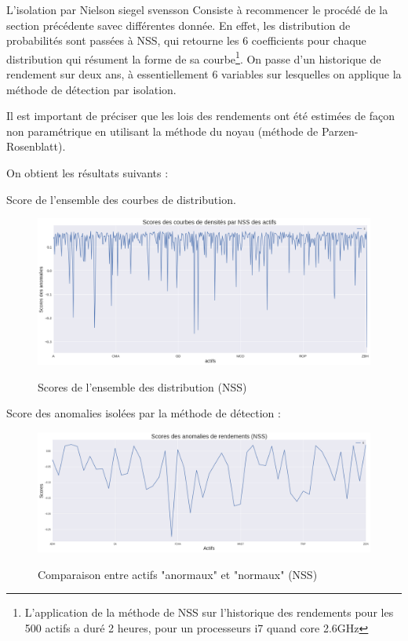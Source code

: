 L'isolation par Nielson siegel svensson Consiste à recommencer le procédé de la section précédente savec différentes donnée. En effet, les distribution de probabilités sont passées à NSS, qui retourne les 6 coefficients pour chaque distribution qui résument la forme de sa courbe\footnote{L'application de la méthode de NSS sur l'historique des rendements pour les 500 actifs a duré 2 heures, pour un processeurs i7 quand core 2.6GHz }. On passe d'un historique de rendement sur deux ans, à essentiellement 6 variables sur lesquelles on applique la méthode de détection par isolation.

Il est important de préciser que les lois des rendements ont été estimées de façon non paramétrique en utilisant la méthode du noyau (méthode de Parzen-Rosenblatt).

On obtient les résultats suivants :

Score de l'ensemble des courbes de distribution.

\begin{figure}[H]
\centering
\caption{Scores de l'ensemble des distribution (NSS)}
   \includegraphics[scale=0.35]{img/scores_densite_nss_all.png}
 \label{anormm2}
\end{figure}

Score des anomalies isolées par la méthode de détection :

\begin{figure}[H]
\centering
\caption{Comparaison entre actifs "anormaux" et "normaux" (NSS)}
   \includegraphics[scale=0.35]{img/scores_densite_NSS.png}
 \label{anormm1}
\end{figure}

